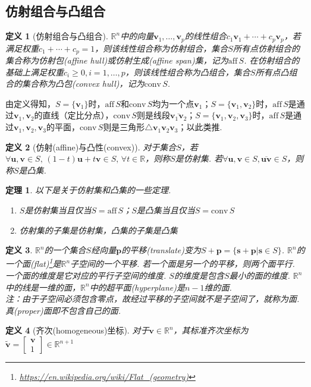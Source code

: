 \documentclass[11pt,UTF8]{ctexart}
\newtheorem{theorem}{定理}
\newtheorem{definition}{定义}
\def\vv{\mathbf{v}}
\def\vu{\mathbf{u}}
\def\rn{\mathbb{R}^n}
\def\aff{\mathrm{aff}\,}
\def\conv{\mathrm{conv}\,}
\newcommand{\vb}[1]{\mathbf{#1}}
\begin{document}
\subsection{仿射组合与凸组合}
\begin{definition}[仿射组合与凸组合]\rm
$\rn$中的向量$\vv_1,\dots,\vv_p$的线性组合$c_1\vv_1+\cdots+c_p\vv_p$，若满足权重$c_1+\cdots+c_p=1$，则该线性组合称为仿射组合，集合$S$所有点仿射组合的集合称为仿射包(affine hull)或仿射生成(affine span)集，记为$\aff S$. 在仿射组合的基础上满足权重$c_i\geq 0,i=1,\dots,p$，则该线性组合称为凸组合，集合$S$所有点凸组合的集合称为凸包(convex hull)，记为$\conv S$.
\end{definition}
由定义得知，$S=\{\vv_1\}$时，$\aff S$和$\conv S$均为一个点$\vv_1$；$S=\{\vv_1,\vv_2\}$时，$\aff S$是通过$\vv_1,\vv_2$的直线（定比分点），$\conv S$则是线段$\overline{\vv_1\vv_2}$；$S=\{\vv_1,\vv_2,\vv_3\}$时，$\aff S$是通过$\vv_1,\vv_2,\vv_3$的平面，$\conv S$则是三角形$\triangle\vv_1\vv_2\vv_3$；以此类推.
\begin{definition}[仿射(affine)与凸性(convex)]
对于集合$S$，若$\forall\vu,\vv\in S,\,(1-t)\vu+t\vv\in S,\,\forall t\in\mathbb{R}$，则称$S$是仿射集. 若$\forall\vu,\vv\in S,\overline{\vu\vv}\in S$，则称$S$是凸集.
\end{definition}
\begin{theorem}以下是关于仿射集和凸集的一些定理.
\begin{enumerate}
	\itemsep -3pt
	\item $S$是仿射集当且仅当$S=\aff S$；$S$是凸集当且仅当$S=\conv S$
	\item 仿射集的子集是仿射集，凸集的子集是凸集
\end{enumerate}
\end{theorem}
\begin{definition}
\rm$\rn$的一个集合$S$经向量$\vb{p}$的平移(translate)变为$S+\vb{p}=\{\vb{s}+\vb{p}|\vb{s}\in S\}$. $\rn$的一个面(flat)\footnote{\url{https://en.wikipedia.org/wiki/Flat_(geometry)}}是$\rn$子空间的一个平移. 若一个面是另一个的平移，则两个面平行. 一个面的维度是它对应的平行子空间的维度. $S$的维度是包含$S$最小的面的维度. $\rn$中的线是一维的面，$\rn$中的超平面(hyperplane)是$n-1$维的面.\\
注：由于子空间必须包含零点，故经过平移的子空间就不是子空间了，就称为面. 真(proper)面即不包含自己的面.
\end{definition}
\begin{definition}[齐次(homogeneous)坐标]
对于$\vv\in\rn$，其标准齐次坐标为$\tilde{\vv}=\begin{bmatrix}\vv\\1\end{bmatrix}\in\mathbb{R}^{n+1}$
\end{definition}
\end{document}

